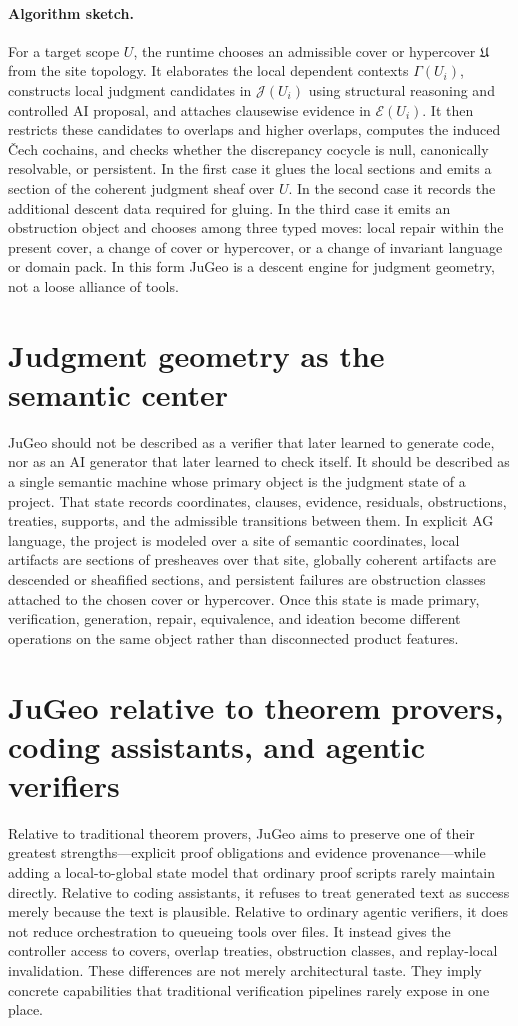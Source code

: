 \documentclass[11pt]{report}
\begin{document}
\paragraph{Algorithm sketch.}
For a target scope $U$, the runtime chooses an admissible cover or hypercover $\mathfrak{U}$ from the site topology. It elaborates the local dependent contexts $\Gamma(U_i)$, constructs local judgment candidates in $\mathscr{J}(U_i)$ using structural reasoning and controlled AI proposal, and attaches clausewise evidence in $\mathscr{E}(U_i)$. It then restricts these candidates to overlaps and higher overlaps, computes the induced \v{C}ech cochains, and checks whether the discrepancy cocycle is null, canonically resolvable, or persistent. In the first case it glues the local sections and emits a section of the coherent judgment sheaf over $U$. In the second case it records the additional descent data required for gluing. In the third case it emits an obstruction object and chooses among three typed moves: local repair within the present cover, a change of cover or hypercover, or a change of invariant language or domain pack. In this form JuGeo is a descent engine for judgment geometry, not a loose alliance of tools.
\section{Judgment geometry as the semantic center}
JuGeo should not be described as a verifier that later learned to generate code, nor as an AI generator that later learned to check itself. It should be described as a single semantic machine whose primary object is the judgment state of a project. That state records coordinates, clauses, evidence, residuals, obstructions, treaties, supports, and the admissible transitions between them. In explicit AG language, the project is modeled over a site of semantic coordinates, local artifacts are sections of presheaves over that site, globally coherent artifacts are descended or sheafified sections, and persistent failures are obstruction classes attached to the chosen cover or hypercover. Once this state is made primary, verification, generation, repair, equivalence, and ideation become different operations on the same object rather than disconnected product features.

\section{JuGeo relative to theorem provers, coding assistants, and agentic verifiers}
Relative to traditional theorem provers, JuGeo aims to preserve one of their greatest strengths---explicit proof obligations and evidence provenance---while adding a local-to-global state model that ordinary proof scripts rarely maintain directly. Relative to coding assistants, it refuses to treat generated text as success merely because the text is plausible. Relative to ordinary agentic verifiers, it does not reduce orchestration to queueing tools over files. It instead gives the controller access to covers, overlap treaties, obstruction classes, and replay-local invalidation. These differences are not merely architectural taste. They imply concrete capabilities that traditional verification pipelines rarely expose in one place.
\end{document}
